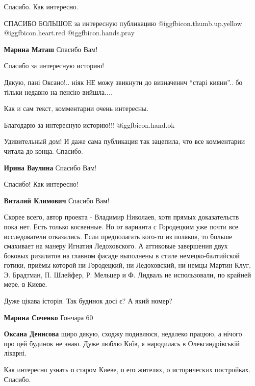 \begin{itemize}
Спасибо. Как интересно.

СПАСИБО БОЛЬШОЕ за интересную публикацию  @igg{fbicon.thumb.up.yellow} @igg{fbicon.heart.red} @igg{fbicon.hands.pray} 

\textbf{Марина Маташ} Спасибо Вам!

Спасибо за интересную историю!

Дякую, пані Оксано!.. ніяк НЕ можу звикнути до визначеннч \enquote{старі кияни}.. бо
тільки недавно на пенсію вийшла....

Как и сам текст, комментарии очень интересны.

Благодарю за интересную историю!!!  @igg{fbicon.hand.ok} 

Удивительный дом! И даже сама публикация так зацепила, что все комментарии читала до конца. Спасибо.

\textbf{Ирина Ваулина} Спасибо Вам!

Спасибо! Как интересно!

\textbf{Виталий Климович} Спасибо Вам!


Скорее всего, автор проекта - Владимир Николаев, хотя прямых доказательств пока
нет. Есть только косвенные. Но от варианта с Городецким уже почти все
исследователи отказались. Если предполагать кого-то из поляков, то больше
смахивает на манеру Игнатия Ледоховского. А аттиковые завершения двух боковых
ризалитов на главном фасаде выполнены в стиле немецко-балтийской готики, приёмы
которой ни Городецкий, ни Ледоховский, ни немцы Мартин Клуг, Э. Брадтман, П.
Шлейфер, Р. Мельцер и Ф. Лидваль не использовали, по крайней мере, в Киеве.


Дуже цікава історія. Так будинок досі є? А який номер?

\begin{itemize} %
\textbf{Марина Соченко} Гончара 60

\textbf{Оксана Денисова} щиро дякую, сходжу подивлюся, недалеко працюю, а нічого про цей будинок не знаю. Дуже люблю Київ, я народилась в Олександрівській лікарні.
\end{itemize} %

Как интересно узнать о старом Киеве, о его жителях, о исторических постройках. Спасибо.


\end{itemize}
